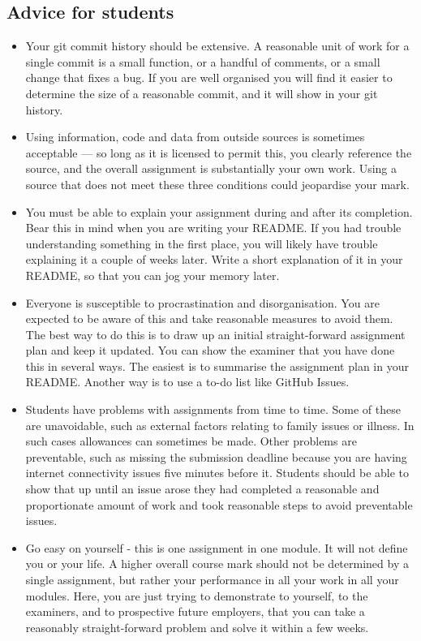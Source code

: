 \documentclass[12pt, a4paper, hidelinks]{scrartcl}
\begin{document}
\subsection*{Advice for students}
  \begin{itemize}
    \item
      Your git commit history should be extensive.
      A reasonable unit of work for a single commit is a small function, or a handful of comments, or a small change that fixes a bug.
      If you are well organised you will find it easier to determine the size of a reasonable commit, and it will show in your git history.
    \item
      Using information, code and data from outside sources is sometimes acceptable --- so long as it is licensed to permit this, you clearly reference the source, and the overall assignment is substantially your own work.
      Using a source that does not meet these three conditions could jeopardise your mark.
    \item
      You must be able to explain your assignment during and after its completion.
      Bear this in mind when you are writing your README.
      If you had trouble understanding something in the first place, you will likely have trouble explaining it a couple of weeks later.
      Write a short explanation of it in your README, so that you can jog your memory later.
    \item
      Everyone is susceptible to procrastination and disorganisation.
      You are expected to be aware of this and take reasonable measures to avoid them.
      The best way to do this is to draw up an initial straight-forward assignment plan and keep it updated.
      You can show the examiner that you have done this in several ways.
      The easiest is to summarise the assignment plan in your README.
      Another way is to use a to-do list like GitHub Issues.
    \item
      Students have problems with assignments from time to time.
      Some of these are unavoidable, such as external factors relating to family issues or illness.
      In such cases allowances can sometimes be made.
      Other problems are preventable, such as missing the submission deadline because you are having internet connectivity issues five minutes before it.
      Students should be able to show that up until an issue arose they had completed a reasonable and proportionate amount of work and took reasonable steps to avoid preventable issues.
    \item
      Go easy on yourself - this is one assignment in one module.
      It will not define you or your life.
      A higher overall course mark should not be determined by a single assignment, but rather your performance in all your work in all your modules.
      Here, you are just trying to demonstrate to yourself, to the examiners, and to prospective future employers, that you can take a reasonably straight-forward problem and solve it within a few weeks.
  \end{itemize}


  
  
\end{document}
